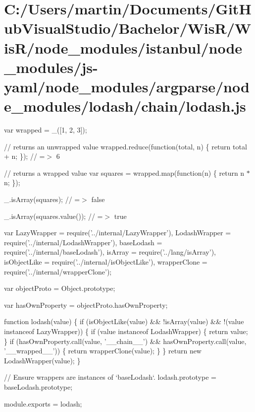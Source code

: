 \hypertarget{_c_1_2_users_2martin_2_documents_2_git_hub_visual_studio_2_bachelor_2_wis_r_2_wis_r_2node_module1bb015b6ab075f06e170ec845926af79}{}\section{C\+:/\+Users/martin/\+Documents/\+Git\+Hub\+Visual\+Studio/\+Bachelor/\+Wis\+R/\+Wis\+R/node\+\_\+modules/istanbul/node\+\_\+modules/js-\/yaml/node\+\_\+modules/argparse/node\+\_\+modules/lodash/chain/lodash.\+js}
var wrapped = \+\_\+(\mbox{[}1, 2, 3\mbox{]});

// returns an unwrapped value wrapped.\+reduce(function(total, n) \{ return total + n; \}); // =$>$ 6

// returns a wrapped value var squares = wrapped.\+map(function(n) \{ return n $\ast$ n; \});

\+\_\+.\+is\+Array(squares); // =$>$ false

\+\_\+.\+is\+Array(squares.\+value()); // =$>$ true


\begin{DoxyCodeInclude}
var LazyWrapper = require(\textcolor{stringliteral}{'../internal/LazyWrapper'}),
    LodashWrapper = require(\textcolor{stringliteral}{'../internal/LodashWrapper'}),
    baseLodash = require(\textcolor{stringliteral}{'../internal/baseLodash'}),
    isArray = require(\textcolor{stringliteral}{'../lang/isArray'}),
    isObjectLike = require(\textcolor{stringliteral}{'../internal/isObjectLike'}),
    wrapperClone = require(\textcolor{stringliteral}{'../internal/wrapperClone'});

var objectProto = Object.prototype;

var hasOwnProperty = objectProto.hasOwnProperty;

\textcolor{keyword}{function} lodash(value) \{
  \textcolor{keywordflow}{if} (isObjectLike(value) && !isArray(value) && !(value instanceof LazyWrapper)) \{
    \textcolor{keywordflow}{if} (value instanceof LodashWrapper) \{
      \textcolor{keywordflow}{return} value;
    \}
    \textcolor{keywordflow}{if} (hasOwnProperty.call(value, \textcolor{stringliteral}{'\_\_chain\_\_'}) && hasOwnProperty.call(value, \textcolor{stringliteral}{'\_\_wrapped\_\_'})) \{
      \textcolor{keywordflow}{return} wrapperClone(value);
    \}
  \}
  \textcolor{keywordflow}{return} \textcolor{keyword}{new} LodashWrapper(value);
\}

\textcolor{comment}{// Ensure wrappers are instances of `baseLodash`.}
lodash.prototype = baseLodash.prototype;

module.exports = lodash;
\end{DoxyCodeInclude}
 